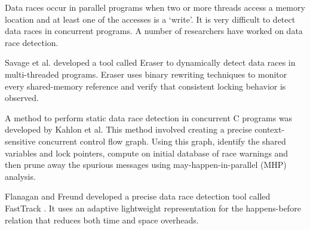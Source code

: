 Data races occur in parallel programs when two or more threads access a memory location and at least one of the accesses is a ‘write’.  It is very difficult to detect data races in concurrent programs. A number of researchers have worked on data race detection.

Savage et al. developed a tool called Eraser \cite{savage1997eraser} to dynamically detect data races in multi-threaded programs. Eraser uses binary rewriting techniques to monitor every shared-memory reference and verify that consistent locking behavior is observed.

A method to perform static data race detection in concurrent C programs was developed by Kahlon et al. This method \cite{kahlon2009static} involved creating a precise context-sensitive concurrent control flow graph. Using this graph, identify the shared variables and lock pointers, compute on initial database of race warnings and then prune away the spurious messages using may-happen-in-parallel (MHP) analysis.

Flanagan and Freund developed a precise data race detection tool called FastTrack \cite{flanagan2009fasttrack}. It uses an adaptive lightweight representation for the happens-before relation that reduces both time and space overheads.
